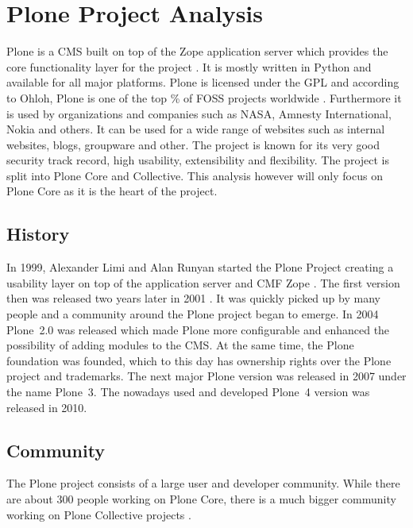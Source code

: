 \section{Plone Project Analysis} %


Plone is a \ac{CMS} built on top of the Zope application server which provides
the core functionality layer for the project \cite{Aspeli2005,PloneFaq,PloneWhatIsPlone}. It is
mostly written in Python and available for all major platforms. Plone is
licensed under the \ac{GPL} and according to Ohloh, Plone is one of the top
\unit[2]{\%} of \ac{FOSS} projects worldwide \cite{PloneOhlohFactoids}.
Furthermore it is used by organizations and companies such as NASA, Amnesty
International, Nokia and others. It can be used for a wide range of websites
such as internal websites, blogs, groupware and other. The project is known for
its very good security track record, high usability, extensibility and
flexibility. The project is split into Plone Core and Collective. This analysis
however will only focus on Plone Core as it is the heart of the project.

\subsection{History} %

In 1999, Alexander Limi and Alan Runyan started the Plone Project creating a
usability layer on top of the application server and \ac{CMF} Zope
\cite{Aspeli2005,PloneFaq}. The first version then was released two years later
in 2001 \cite{PloneReleases}. It was quickly picked up by many people and a
community around the Plone project began to emerge. In 2004 Plone~2.0 was
released which made Plone more configurable and enhanced the possibility of
adding modules to the \ac{CMS}. At the same time, the Plone foundation was
founded, which to this day has ownership rights over the Plone project and
trademarks. The next major Plone version was released in 2007 under the name
Plone~3. The nowadays used and developed Plone~4 version was released in 2010.


\subsection{Community} %

The Plone project consists of a large user and developer community. While there
are about 300 people working on Plone Core, there is a much bigger community
working on Plone Collective projects
\cite{Aspeli2005,PloneOhlohFactoids,PloneCommunityProcesses}.

